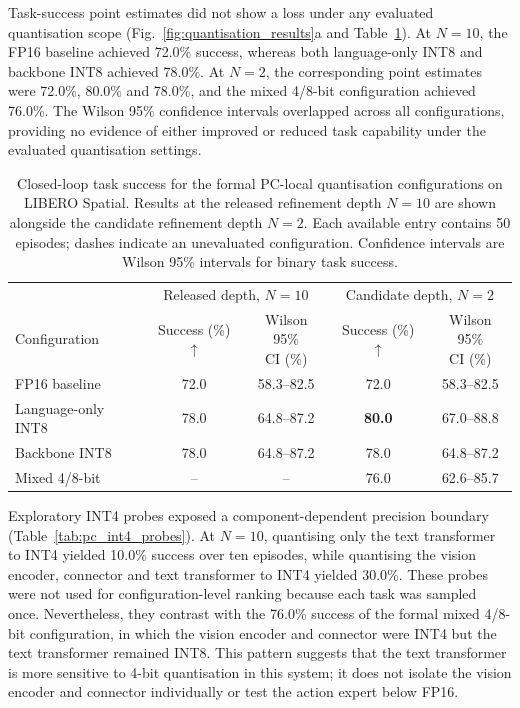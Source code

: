 Task-success point estimates did not show a loss under any evaluated
quantisation scope (Fig.~\ref{fig:quantisation_results}a and
Table~\ref{tab:pc_quant_success}). At \(N=10\), the FP16
baseline achieved 72.0\% success, whereas both language-only INT8 and backbone
INT8 achieved 78.0\%. At \(N=2\), the corresponding point estimates were
72.0\%, 80.0\% and 78.0\%, and the mixed 4/8-bit configuration achieved
76.0\%. The Wilson 95\% confidence intervals overlapped across all
configurations, providing no evidence of either improved or reduced task
capability under the evaluated quantisation settings.

\begin{table}
  \centering
  \caption{Closed-loop task success for the formal PC-local quantisation
  configurations on LIBERO Spatial. Results at the released refinement depth
  \(N=10\) are shown alongside the candidate refinement depth \(N=2\). Each
  available entry contains 50 episodes; dashes indicate an unevaluated
  configuration. Confidence intervals are Wilson 95\% intervals for binary
  task success.}
  \label{tab:pc_quant_success}
  \small
  \setlength{\tabcolsep}{4pt}
  \begin{tabular}{@{}lcccc@{}}
    \toprule
    & \multicolumn{2}{c}{Released depth, \(N=10\)} &
      \multicolumn{2}{c}{Candidate depth, \(N=2\)} \\
    \cmidrule(lr){2-3}\cmidrule(lr){4-5}
    Configuration &
    \shortstack{Success\\(\%) \(\uparrow\)} &
    \shortstack{Wilson 95\%\\CI (\%)} &
    \shortstack{Success\\(\%) \(\uparrow\)} &
    \shortstack{Wilson 95\%\\CI (\%)} \\
    \midrule
    FP16 baseline      & 72.0 & 58.3--82.5 & 72.0 & 58.3--82.5 \\
    Language-only INT8 & 78.0 & 64.8--87.2 & \textbf{80.0} & 67.0--88.8 \\
    Backbone INT8      & 78.0 & 64.8--87.2 & 78.0 & 64.8--87.2 \\
    Mixed 4/8-bit      & --   & --         & 76.0 & 62.6--85.7 \\
    \bottomrule
  \end{tabular}
\end{table}

Exploratory INT4 probes exposed a component-dependent precision boundary
(Table~\ref{tab:pc_int4_probes}). At \(N=10\), quantising only the text
transformer to INT4 yielded 10.0\% success over ten episodes, while quantising
the vision encoder, connector and text transformer to INT4 yielded 30.0\%.
These probes were not used for configuration-level ranking because each task
was sampled once. Nevertheless, they contrast with the 76.0\% success of the
formal mixed 4/8-bit configuration, in which the vision encoder and connector
were INT4 but the text transformer remained INT8. This pattern suggests that
the text transformer is more sensitive to 4-bit quantisation in this system;
it does not isolate the vision encoder and connector individually or test the
action expert below FP16.

